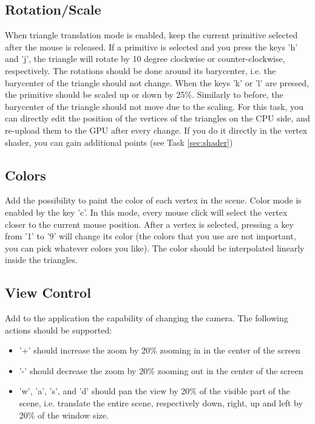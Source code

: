 \documentclass[11pt]{article}
\begin{document}
\subsection{Rotation/Scale}

When triangle translation mode is enabled, keep the current primitive selected after the mouse is released. If a primitive is selected and you press the keys 'h' and 'j', the triangle will rotate by 10 degree clockwise or counter-clockwise, respectively. The rotations should be done around its barycenter, i.e. the barycenter of the triangle should not change. When the keys 'k' or 'l' are pressed, the primitive should be scaled up or down by 25\%. Similarly to before, the barycenter of the triangle should not move due to the scaling. For this task, you can directly edit the position of the vertices of the triangles on the CPU side, and re-upload them to the GPU after every change. If you do it directly in the vertex shader, you can gain additional points (see Task \ref{sec:shader})

\subsection{Colors}

Add the possibility to paint the color of each vertex in the scene. Color mode is enabled by the key 'c'. In this mode, every mouse click will select the vertex closer to the current mouse position. After a vertex is selected, pressing a key from '1' to '9' will change its color (the colors that you use are not important, you can pick whatever colors you like). The color should be interpolated linearly inside the triangles.

\subsection{View Control}

Add to the application the capability of changing the camera. The following actions should be supported:
\begin{itemize}
	\item '+' should increase the zoom by 20\% zooming in in the center of the screen
	\item '-' should decrease the zoom by 20\% zooming out in the center of the screen
	\item 'w', 'a', 's', and 'd' should pan the view by 20\% of the visible part of the scene, i.e. translate the entire scene, respectively down, right, up and left by 20\% of the window size.
\end{itemize}
\end{document}
